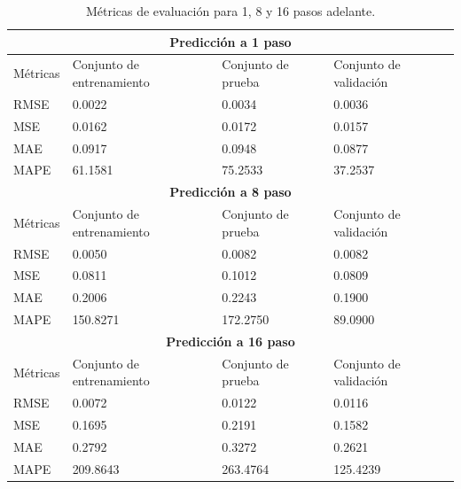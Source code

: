 \documentclass[12pt]{article}
\begin{document}
\begin{itemize}
\begin{table}[h!]
		\centering
		\caption{Métricas de evaluación para 1, 8 y 16 pasos adelante.}
		\begin{tabular}{|l|l|l|l|}
			\hline
			 \multicolumn{4}{|c|}{\textbf{Predicción a 1 paso}}                                 \\ \hline
			Métricas & Conjunto de entrenamiento & Conjunto de prueba & Conjunto de validación \\ \hline
			RMSE     & 0.0022                    & 0.0034             & 0.0036                 \\ \hline
			MSE      & 0.0162                    & 0.0172             & 0.0157                 \\ \hline
			MAE      & 0.0917                    & 0.0948             & 0.0877                 \\ \hline
			MAPE     & 61.1581                   & 75.2533            & 37.2537                \\ \hline
			 \multicolumn{4}{|c|}{\textbf{Predicción a 8 paso}}                                 \\ \hline
			Métricas & Conjunto de entrenamiento & Conjunto de prueba & Conjunto de validación \\ \hline
			RMSE     & 0.0050                    & 0.0082             & 0.0082                 \\ \hline
			MSE      & 0.0811                    & 0.1012             & 0.0809                 \\ \hline
			MAE      & 0.2006                    & 0.2243             & 0.1900                 \\ \hline
			MAPE     & 150.8271                  & 172.2750           & 89.0900                \\ \hline
			 \multicolumn{4}{|c|}{\textbf{Predicción a 16 paso}}                                \\ \hline
			Métricas & Conjunto de entrenamiento & Conjunto de prueba & Conjunto de validación \\ \hline
			RMSE     & 0.0072                    & 0.0122             & 0.0116                 \\ \hline
			MSE      & 0.1695                    & 0.2191             & 0.1582                 \\ \hline
			MAE      & 0.2792                    & 0.3272             & 0.2621                 \\ \hline
			MAPE     & 209.8643                  & 263.4764           & 125.4239               \\ \hline
		\end{tabular}
		\label{tab_pred_red}
	\end{table}
	

\end{itemize}
\end{document}

